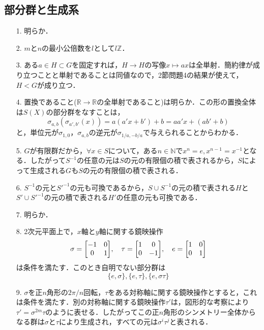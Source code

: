 \documentclass[a4paper,10pt,uplatex]{jsarticle}
\newcommand{\N}{\mathbb{N}}
\newcommand{\R}{\mathbb{R}}
\newcommand{\Z}{\mathbb{Z}}
\numberwithin{equation}{section}
\theoremstyle{mystyle}
\begin{document}
\subsection{部分群と生成系}
\begin{itemize}
    \item[1.] 明らか．
    \item[2.] $m$と$n$の最小公倍数を$l$として$l\Z$．
    \item[3.] ある$a \in H \subset G$を固定すれば，$H \to H$の写像$x \mapsto ax$は全単射．簡約律が成り立つことと単射であることは同値なので，2節問題4の結果が使えて，$H<G$が成り立つ．
    \item[4.] 置換であること($\R \to \R$の全単射であること)は明らか．この形の置換全体は$S(X)$の部分群をなすことは，
    \begin{equation}
        \sigma_{a,b}(\sigma_{a',b'}(x)) = a(a'x+b') + b = aa'x + (ab' + b)
    \end{equation}
    と，単位元が$\sigma_{1,0}$，$\sigma_{a,b}$の逆元が$\sigma_{1/a,-b/a}$で与えられることからわかる．
    \item[5.] $G$が有限群だから，$\forall x \in S$について，ある$n \in \N$で$x^n = e, x^{n-1} = x^{-1}$となる．したがって$S^{-1}$の任意の元は$S$の元の有限個の積で表されるから，$S$によって生成される$G$も$S$の元の有限個の積で表される．
    \item[6.] $S^{-1}$の元と$S'^{-1}$の元も可換であるから，$S \cup S^{-1}$の元の積で表される$H$と$S' \cup S'^{-1}$の元の積で表される$H'$の任意の元も可換である．
    \item[7.] 明らか．
    \item[8.] 2次元平面上で，$x$軸と$y$軸に関する鏡映操作
    \begin{equation}
        \sigma = \mqty[-1 & 0\\0 & 1], \quad \tau = \mqty[1 & 0 \\ 0 & -1], \quad e = \mqty[1 & 0 \\ 0 & 1]
    \end{equation}
    は条件を満たす．このとき自明でない部分群は
    \begin{equation}
        \{e, \sigma\}, \{e, \tau\}, \{e, \sigma\tau\}
    \end{equation}
    \item[9.] $\sigma$を正$n$角形の$2\pi/n$回転，$\tau$をある対称軸に関する鏡映操作とすると，これは条件を満たす．別の対称軸に関する鏡映操作$\tau'$は，図形的な考察により$\tau' = \sigma^{2m} \tau$のように表せる．したがってこの正$n$角形のシンメトリー全体からなる群は$\sigma$と$\tau$により生成され，すべての元は$\sigma^i \tau^j$と表される．

\end{itemize}
\end{document}
